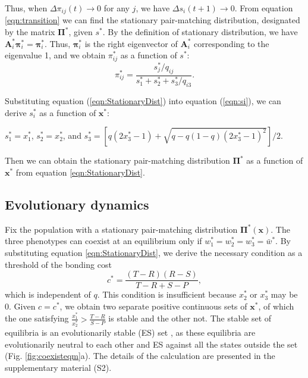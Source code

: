 \documentclass[12pt]{article}
\begin{document}
Thus, when $\Delta \pi_{ij}(t) \rightarrow 0$ for any $j$, we have $\Delta s_i(t+1) \rightarrow 0$. From equation \eqref{eqn:transition} we can find the stationary pair-matching distribution, designated by the matrix $\mathbf{\Pi}^*$, given $s^*$. By the definition of stationary distribution, we have $\mathbf{A}_i^* \mathbf{\pi}_i^* = \mathbf{\pi}_i^*$. Thus, $\mathbf{\pi}_i^*$ is the right eigenvector of $\mathbf{A}_i^*$ corresponding to the eigenvalue 1, and we obtain $\pi_{ij}^*$ as a function of $s^*$:
\begin{equation}
\pi_{ij}^*=\frac{s_{j}^*/q_{ij}} {s_1^*+s_2^*+s_3^*/q_{i3}}.
\label{eqn:StationaryDist}
\end{equation}

Substituting equation (\ref{eqn:StationaryDist}) into equation (\ref{eqn:si}), we can derive $s_i^*$ as a function of $\mathbf{x}^*$: 

$s_1^*=x^*_1$, $s_2^*=x^*_2$, and $s_3^*=\left[q(2 x^*_3 -1) + \sqrt{q-q(1-q)(2 x^*_3 -1)^2}\right]/2$. 

Then we can obtain the stationary pair-matching distribution $\mathbf{\Pi}^*$ as a function of $\mathbf{x}^*$ from equation \eqref{eqn:StationaryDist}.

\subsection*{Evolutionary dynamics}

Fix the population with a stationary pair-matching distribution $\mathbf{\Pi}^*(\mathbf{x})$. The three phenotypes can coexist at an equilibrium only if $w^*_1=w^*_2=w^*_3=\bar{w}^*$. By substituting equation \ref{eqn:StationaryDist}, we derive the necessary condition as a threshold of the bonding cost
\begin{equation}
c^*=\frac{(T-R)(R-S)}{T-R+S-P}, 
\label{eqn:cthreshold}
\end{equation}
which is independent of $q$. This condition is insufficient because $x^*_2$ or $x^*_3$ may be 0. Given $c=c^*$, we obtain two separate positive continuous sets of $\mathbf{x}^*$, of which the one satisfying $\tfrac{x^*_1}{x^*_2} > \tfrac{T-R}{S-P}$ is stable and the other not. The stable set of equilibria is an evolutionarily stable (ES) set \citep{Thomas1985}, as these equilibria are evolutionarily neutral to each other and ES against all the states outside the set (Fig. \ref{fig:coexisteqm}a). The details of the calculation are presented in the supplementary material (S2).
\end{document}
